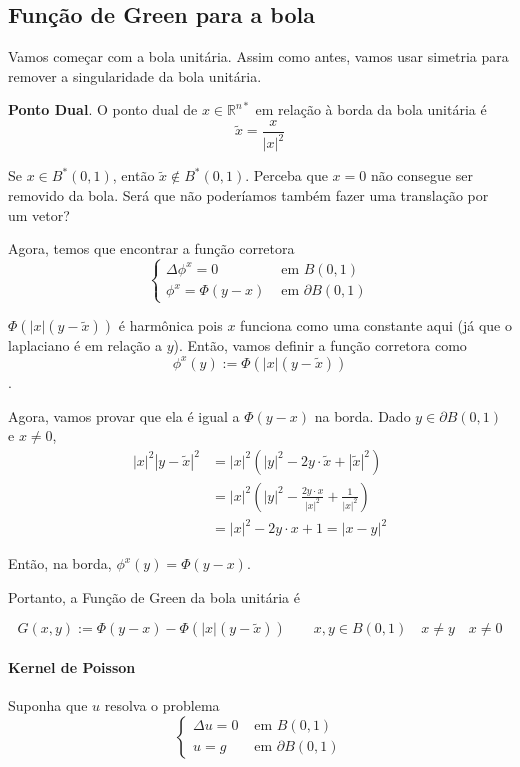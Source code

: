 \documentclass[11pt]{article}
\newcommand{\R}{\mathbb{R}}
\newcommand{\p}{\partial}
\begin{document}
\subsection{Função de Green para a bola}

Vamos começar com a bola unitária. Assim como antes, vamos usar simetria para remover a singularidade da bola unitária.

\textbf{Ponto Dual}. O ponto dual de \(x \in \R^{n*}\) em relação à borda da bola unitária é \[\tilde{x} = \frac{x}{|x|^2}\]

Se \(x \in B^*(0,1)\), então \(\tilde{x} \notin B^*(0,1)\). Perceba que \(x=0\) não consegue ser removido da bola. Será que não poderíamos também fazer uma translação por um vetor?

Agora, temos que encontrar a função corretora
\[\begin{cases}
	\Delta \phi^x = 0 & \text{ em } B(0,1) \\
	\phi^x= \Phi(y-x) & \text{ em } \p B(0,1)
\end{cases}\]

\(\Phi(|x|(y-\tilde{x}))\) é harmônica pois \( x \) funciona como uma constante aqui (já que o laplaciano é em relação a \( y \)). Então, vamos definir a função corretora como \[\phi^x (y) := \Phi(|x| (y-\tilde{x}))\].

Agora, vamos provar que ela é igual a \(\Phi(y-x)\) na borda. Dado \(y \in \p B(0,1)\) e \(x\neq 0\),
\begin{align*}
	|x|^2 |y-\tilde{x}|^2 &= |x|^2 \left( |y|^2 - 2y\cdot \tilde{x} + |\tilde{x}|^2 \right) \\
	&= |x|^2 \left( |y|^2 - \frac{2y\cdot x}{|x|^2} + \frac{1}{|x|^2}\right) \\
	&= |x|^2 - 2y\cdot x +1 = |x-y|^2
\end{align*}

Então, na borda, \(\phi^x(y) = \Phi(y-x)\).

Portanto, a Função de Green da bola unitária é

\[G(x,y):=\Phi(y-x) - \Phi(|x|(y-\tilde{x})) \qquad x,y \in B(0,1) \quad  x\neq y \quad x\neq0 \]

\paragraph{Kernel de Poisson}
Suponha que \(u\) resolva o problema
\[\begin{cases}
	\Delta u = 0 & \text{ em } B(0,1) \\
	u = g & \text{ em } \p B(0,1)
\end{cases}\]
\end{document}
